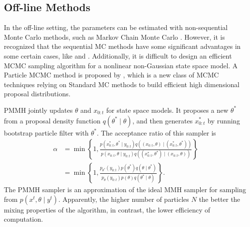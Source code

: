 \subsection{Off-line Methods}

In the off-line setting, the parameters can be estimated with non-sequential Monte Carlo methods, such as Markov Chain Monte Carlo \cite{robert2004monte}. However, it is recognized that the sequential MC methods have some significant advantages in some certain cases, like \cite{cappe2009inference} and \cite{del2006sequential}. Additionally, it is difficult to design an efficient MCMC sampling algorithm for a nonlinear non-Gaussian state space model. A Particle  MCMC method is proposed by \cite{andrieu2010particle}, which is a new class of MCMC techniques relying on Standard MC methods to build efficient high dimensional proposal distributions. 

PMMH jointly updates $\theta$ and $x_{0:t}$ for state space models. It proposes a new $\theta^*$ from a proposal density function $q(\theta^* \mid \theta)$, and then generates $x^*_{0:t}$ by running bootstrap particle filter with $\theta^*$. The acceptance ratio of this sampler is
\begin{align*}
\alpha &= \min \left\lbrace 1,\frac{ p(x_{0:t}^*, \theta^* \mid y_{0:t} ) q((x_{0:t},\theta) \mid  (x_{0:t}^*,\theta^*)   ) }{  p(x_{0:t}, \theta \mid y_{0:t} ) q((x_{0:t}^*,\theta^*) \mid  (x_{0:t},\theta) ) }  \right\rbrace \\
           &= \min \left\lbrace 1,\frac{p_{\theta^*} (y_{0:t}) p(\theta^*)q(\theta\mid\theta^*) }{  p_{\theta} (y_{0:t}) p(\theta)q(\theta^*\mid\theta)  }  \right\rbrace .
\end{align*}
The PMMH sampler is an approximation of the ideal MMH sampler for sampling from $p(x^t,\theta\mid y^t)$. Apparently, the higher number of particles $N$ the better the mixing properties of the algorithm, in contrast, the lower efficiency of computation.

